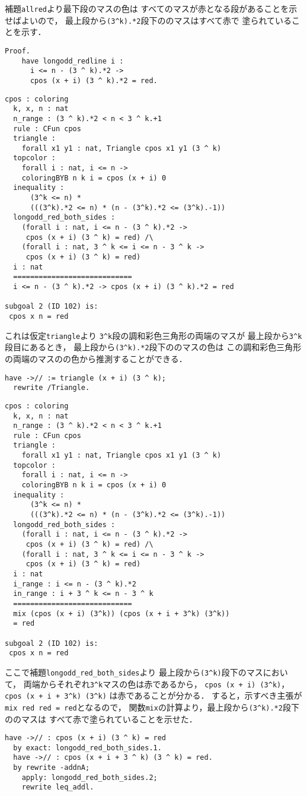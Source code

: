補題{\tt{allred}}より最下段のマスの色は
すべてのマスが赤となる段があることを示せばよいので，
最上段から{\tt{(3\verb|^|k).*2}}段下ののマスはすべて赤で
塗られていることを示す．
\begin{lstlisting}[language=Coq]
  Proof.
    have longodd_redline i :
      i <= n - (3 ^ k).*2 ->
      cpos (x + i) (3 ^ k).*2 = red.
\end{lstlisting}
\begin{lstlisting}[language=Coq]
  cpos : coloring
  k, x, n : nat
  n_range : (3 ^ k).*2 < n < 3 ^ k.+1
  rule : CFun cpos
  triangle :
    forall x1 y1 : nat, Triangle cpos x1 y1 (3 ^ k)
  topcolor :
    forall i : nat, i <= n ->
    coloringBYB n k i = cpos (x + i) 0
  inequality :
      (3^k <= n) *
      (((3^k).*2 <= n) * (n - (3^k).*2 <= (3^k).-1))
  longodd_red_both_sides :
    (forall i : nat, i <= n - (3 ^ k).*2 ->
     cpos (x + i) (3 ^ k) = red) /\
    (forall i : nat, 3 ^ k <= i <= n - 3 ^ k ->
     cpos (x + i) (3 ^ k) = red)
  i : nat
  ============================
  i <= n - (3 ^ k).*2 -> cpos (x + i) (3 ^ k).*2 = red

subgoal 2 (ID 102) is:
 cpos x n = red
\end{lstlisting}
これは仮定{\tt{triangle}}より
{\tt{3\verb|^|k}}段の調和彩色三角形の両端のマスが
最上段から{\tt{3\verb|^|k}}段目にあるとき，
最上段から{\tt{(3\verb|^|k).*2}}段下ののマスの色は
この調和彩色三角形の両端のマスのの色から推測することができる．
\begin{lstlisting}[language=Coq]
  have ->// := triangle (x + i) (3 ^ k);
  rewrite /Triangle. 
\end{lstlisting}
\begin{lstlisting}[language=Coq]
  cpos : coloring
  k, x, n : nat
  n_range : (3 ^ k).*2 < n < 3 ^ k.+1
  rule : CFun cpos
  triangle :
    forall x1 y1 : nat, Triangle cpos x1 y1 (3 ^ k)
  topcolor :
    forall i : nat, i <= n ->
    coloringBYB n k i = cpos (x + i) 0
  inequality :
      (3^k <= n) *
      (((3^k).*2 <= n) * (n - (3^k).*2 <= (3^k).-1))
  longodd_red_both_sides :
    (forall i : nat, i <= n - (3 ^ k).*2 ->
     cpos (x + i) (3 ^ k) = red) /\
    (forall i : nat, 3 ^ k <= i <= n - 3 ^ k ->
     cpos (x + i) (3 ^ k) = red)
  i : nat
  i_range : i <= n - (3 ^ k).*2
  in_range : i + 3 ^ k <= n - 3 ^ k
  ============================
  mix (cpos (x + i) (3^k)) (cpos (x + i + 3^k) (3^k))
  = red

subgoal 2 (ID 102) is:
 cpos x n = red
\end{lstlisting}
ここで補題{\tt{longodd\_red\_both\_sides}}より
最上段から{\tt{(3\verb|^|k)}}段下のマスにおいて，
両端からそれぞれ{\tt{3\verb|^|k}}マスの色は赤であるから，
{\tt{cpos (x + i) (3\verb|^|k)}}，
{\tt{cpos (x + i + 3\verb|^|k) (3\verb|^|k)}}
は赤であることが分かる．
すると，示すべき主張が{\tt{mix red red = red}}となるので，
関数{\tt{mix}}の計算より，最上段から{\tt{(3\verb|^|k).*2}}段下ののマスは
すべて赤で塗られていることを示せた．
\begin{lstlisting}[language=Coq]
  have ->// : cpos (x + i) (3 ^ k) = red
  by exact: longodd_red_both_sides.1.
  have ->// : cpos (x + i + 3 ^ k) (3 ^ k) = red.
  by rewrite -addnA;
    apply: longodd_red_both_sides.2;
    rewrite leq_addl.
\end{lstlisting}

